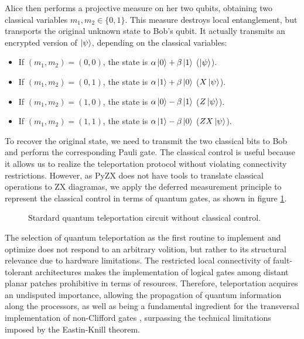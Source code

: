 \documentclass[12pt, twoside, openany]{book}
\begin{document}
Alice then performs a projective measure on her two qubits, obtaining two classical variables $m_1, m_2 \in \{ 0,1 \} $. This measure destroys local entanglement, but transports the original unknown state to Bob's qubit. It actually transmits an encrypted version of $\ket{\psi}$, depending on the classical variables:
\begin{itemize}
    \item If $(m_1,m_2) = (0,0)$, the state is $\alpha \ket{0} + \beta \ket{1}$ ($\ket{\psi}$).
    \item If $(m_1,m_2) = (0,1)$, the state is $\alpha \ket{1} + \beta \ket{0}$ ($X\ket{\psi}$).
    \item If $(m_1,m_2) = (1,0)$, the state is $\alpha \ket{0} - \beta \ket{1}$ ($Z\ket{\psi}$).
    \item If $(m_1,m_2) = (1,1)$, the state is $\alpha \ket{1} - \beta \ket{0}$ ($ZX\ket{\psi}$).
\end{itemize}

To recover the original state, we need to transmit the two classical bits to Bob and perform the corresponding Pauli gate. The classical control is useful because it allows us to realize the teleportation protocol without violating connectivity restrictions. However, as PyZX does not have tools to translate classical operations to ZX diagramas, we apply the deferred measurement principle \cite{NielsenChuang2010} to represent the classical control in terms of quantum gates, as shown in figure \ref{fig:teleportation_circuit_CZ}.

\begin{figure} [ht]
    \centering
    
    \caption{Stardard quantum teleportation circuit without classical control.}
    \label{fig:teleportation_circuit_CZ}
\end{figure}

The selection of quantum teleportation as the first routine to implement and optimize does not respond to an arbitrary volition, but rather to its structural relevance due to hardware limitations. The restricted local connectivity of fault-tolerant architectures makes the implementation of logical gates among distant planar patches prohibitive in terms of resources. Therefore, teleportation acquires an undisputed importance, allowing the propagation of quantum information along the processors, as well as being a fundamental ingredient for the transversal implementation of non-Clifford gates \cite{deBeaudrap2020}, surpassing the technical limitations imposed by the Eastin-Knill theorem.
\end{document}
